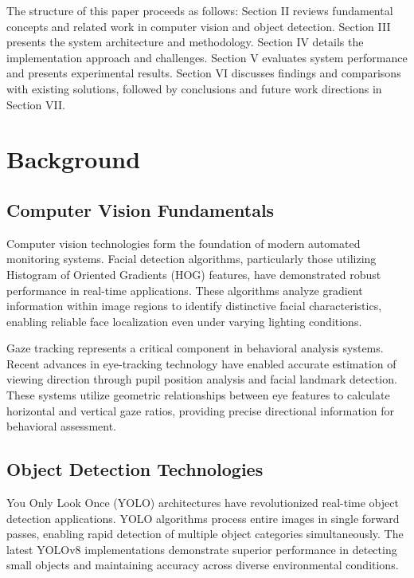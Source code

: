 \documentclass[conference]{IEEEtran}
\begin{document}
The structure of this paper proceeds as follows: Section II reviews fundamental 
concepts and related work in computer vision and object detection. Section III 
presents the system architecture and methodology. Section IV details the implementation 
approach and challenges. Section V evaluates system performance and presents experimental 
results. Section VI discusses findings and comparisons with existing solutions, 
followed by conclusions and future work directions in Section VII\@.

\section{Background}

\subsection{Computer Vision Fundamentals}

Computer vision technologies form the foundation of modern automated monitoring systems. 
Facial detection algorithms, particularly those utilizing Histogram of Oriented Gradients 
(HOG) features, have demonstrated robust performance in real-time applications\cite{hasan2021face}. 
These algorithms analyze gradient information within image regions to identify distinctive 
facial characteristics, enabling reliable face localization even under varying lighting conditions.

Gaze tracking represents a critical component in behavioral analysis systems. Recent advances 
in eye-tracking technology have enabled accurate estimation of viewing direction through 
pupil position analysis and facial landmark detection\cite{dilini2021cheating}. These systems 
utilize geometric relationships between eye features to calculate horizontal and vertical 
gaze ratios, providing precise directional information for behavioral assessment\cite{el2023drowsiness}.

\subsection{Object Detection Technologies}

You Only Look Once (YOLO) architectures have revolutionized real-time object detection 
applications. YOLO algorithms process entire images in single forward passes, enabling 
rapid detection of multiple object categories simultaneously\cite{wang2022object}. The 
latest YOLOv8 implementations demonstrate superior performance in detecting small objects 
and maintaining accuracy across diverse environmental conditions\cite{v7labs2023yolo}.
\end{document}

